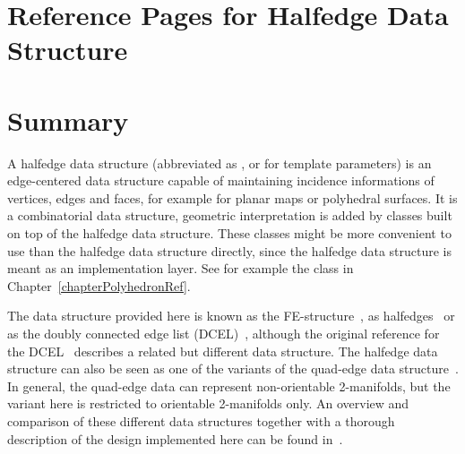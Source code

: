 
\clearpage
\section{Reference Pages for Halfedge Data Structure}
\label{chapterHalfedgeDSRef}

\section*{Summary}

A halfedge data structure (abbreviated as , or
 for template parameters) is an edge-centered data structure
capable of maintaining incidence informations of vertices, edges and
faces, for example for planar maps or polyhedral surfaces. It is a
combinatorial data structure, geometric interpretation is added by
classes built on top of the halfedge data structure.  These classes
might be more convenient to use than the halfedge data structure
directly, since the halfedge data structure is meant as an
implementation layer.  See for example the 
class in Chapter~\ref{chapterPolyhedronRef}.

The data structure provided here is known as the
FE-structure~\cite{w-ebdss-85}, as
halfedges~\cite{m-ism-88,bfh-mgedm-95} or as the doubly connected edge
list (DCEL)~\cite{bkos-cgaa-97}, although the original reference for
the DCEL~\cite{mp-fitcp-78} describes a related but different data
structure. The halfedge data structure can also be seen as one of the
variants of the quad-edge data structure~\cite{gs-pmgsc-85}. In
general, the quad-edge data can represent non-orientable 2-manifolds,
but the variant here is restricted to orientable 2-manifolds only. An
overview and comparison of these different data structures together
with a thorough description of the design implemented here can be
found in~\cite{k-ugpdd-99}.


